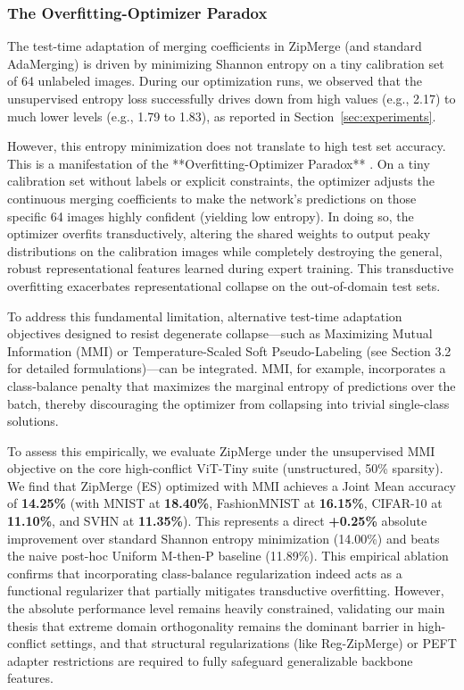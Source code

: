 \subsubsection{The Overfitting-Optimizer Paradox}
The test-time adaptation of merging coefficients in ZipMerge (and standard AdaMerging) is driven by minimizing Shannon entropy on a tiny calibration set of 64 unlabeled images. During our optimization runs, we observed that the unsupervised entropy loss successfully drives down from high values (e.g., 2.17) to much lower levels (e.g., 1.79 to 1.83), as reported in Section~\ref{sec:experiments}. 

However, this entropy minimization does not translate to high test set accuracy. This is a manifestation of the **Overfitting-Optimizer Paradox** \cite{daheim2023elastic}. On a tiny calibration set without labels or explicit constraints, the optimizer adjusts the continuous merging coefficients to make the network's predictions on those specific 64 images highly confident (yielding low entropy). In doing so, the optimizer overfits transductively, altering the shared weights to output peaky distributions on the calibration images while completely destroying the general, robust representational features learned during expert training. This transductive overfitting exacerbates representational collapse on the out-of-domain test sets.

To address this fundamental limitation, alternative test-time adaptation objectives designed to resist degenerate collapse—such as Maximizing Mutual Information (MMI) or Temperature-Scaled Soft Pseudo-Labeling (see Section 3.2 for detailed formulations)—can be integrated. MMI, for example, incorporates a class-balance penalty that maximizes the marginal entropy of predictions over the batch, thereby discouraging the optimizer from collapsing into trivial single-class solutions. 

To assess this empirically, we evaluate ZipMerge under the unsupervised MMI objective on the core high-conflict ViT-Tiny suite (unstructured, 50\% sparsity). We find that ZipMerge (ES) optimized with MMI achieves a Joint Mean accuracy of \textbf{14.25\%} (with MNIST at \textbf{18.40\%}, FashionMNIST at \textbf{16.15\%}, CIFAR-10 at \textbf{11.10\%}, and SVHN at \textbf{11.35\%}). This represents a direct \textbf{+0.25\%} absolute improvement over standard Shannon entropy minimization (14.00\%) and beats the naive post-hoc Uniform M-then-P baseline (11.89\%). This empirical ablation confirms that incorporating class-balance regularization indeed acts as a functional regularizer that partially mitigates transductive overfitting. However, the absolute performance level remains heavily constrained, validating our main thesis that extreme domain orthogonality remains the dominant barrier in high-conflict settings, and that structural regularizations (like Reg-ZipMerge) or PEFT adapter restrictions are required to fully safeguard generalizable backbone features.

